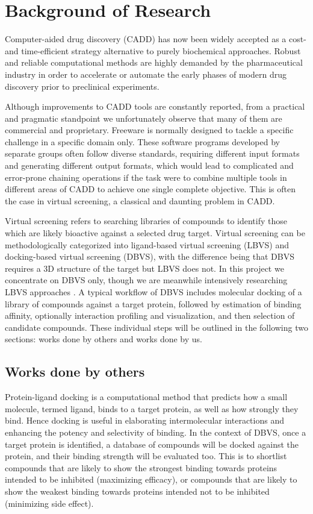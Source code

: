 \documentclass[a4paper,12pt]{article}
\begin{document}
\section*{Background of Research}

Computer-aided drug discovery (CADD) has now been widely accepted as a cost- and time-efficient strategy alternative to purely biochemical approaches. Robust and reliable computational methods are highly demanded by the pharmaceutical industry in order to accelerate or automate the early phases of modern drug discovery prior to preclinical experiments.

Although improvements to CADD tools are constantly reported, from a practical and pragmatic standpoint we unfortunately observe that many of them are commercial and proprietary. Freeware is normally designed to tackle a specific challenge in a specific domain only. These software programs developed by separate groups often follow diverse standards, requiring different input formats and generating different output formats, which would lead to complicated and error-prone chaining operations if the task were to combine multiple tools in different areas of CADD to achieve one single complete objective. This is often the case in virtual screening, a classical and daunting problem in CADD.

Virtual screening refers to searching libraries of compounds to identify those which are likely bioactive against a selected drug target. Virtual screening can be methodologically categorized into ligand-based virtual screening (LBVS) and docking-based virtual screening (DBVS), with the difference being that DBVS requires a 3D structure of the target but LBVS does not. In this project we concentrate on DBVS only, though we are meanwhile intensively researching LBVS approaches \citep{1749}. A typical workflow of DBVS includes molecular docking of a library of compounds against a target protein, followed by estimation of binding affinity, optionally interaction profiling and visualization, and then selection of candidate compounds. These individual steps will be outlined in the following two sections: works done by others and works done by us.

\subsection*{Works done by others}

Protein-ligand docking is a computational method that predicts how a small molecule, termed ligand, binds to a target protein, as well as how strongly they bind. Hence docking is useful in elaborating intermolecular interactions and enhancing the potency and selectivity of binding. In the context of DBVS, once a target protein is identified, a database of compounds will be docked against the protein, and their binding strength will be evaluated too. This is to shortlist compounds that are likely to show the strongest binding towards proteins intended to be inhibited (maximizing efficacy), or compounds that are likely to show the weakest binding towards proteins intended not to be inhibited (minimizing side effect).
\end{document}
